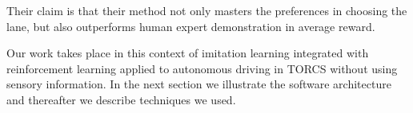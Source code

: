 Their claim is that their method not only masters the preferences in choosing the lane, but also outperforms human expert demonstration in
average reward.



Our work takes place in this context of imitation learning integrated with reinforcement learning applied to autonomous driving in TORCS without using sensory information. In the next section we illustrate the software architecture and thereafter we describe techniques we used. 
